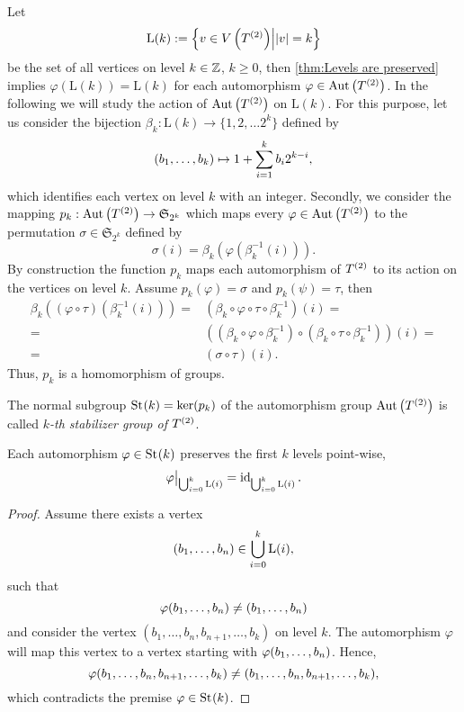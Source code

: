 Let
\begin{equation*}
\mathrm{L}(k):=\left\lbrace v\in\VT\middle\vert \lvert v\rvert=k\right\rbrace
\end{equation*}
be the set of all vertices on level $k\in\Z$, $k\geq 0$,  then \cref{thm:Levels are preserved} implies $\varphi(\mathrm{L}(k))=\mathrm{L}(k)$ for each automorphism $\varphi\in\AutT$. In the following we will study the action of $\AutT$ on $\mathrm{L}(k)$. For this purpose, let us consider the bijection $\beta_k\colon\mathrm{L}(k)\to\lbrace 1,2,\ldots 2^k\rbrace$ defined by 
\begin{equation*}
(\seq[k]{b})\mapsto 1+\sum_{i=1}^{k} b_i2^{k-i},
\end{equation*}
which identifies each vertex on level $k$ with an integer. Secondly, we consider the mapping $p_k:\AutT\to\mathfrak{S}_{2^k}$ which maps every $\varphi\in\AutT$ to the permutation $\sigma\in\mathfrak{S}_{2^k}$ defined by
\begin{equation*}
\sigma(i)=\beta_k(\varphi(\beta_k^{-1}(i))).
\end{equation*}
By construction the function $p_k$ maps each automorphism of $\T$ to its action on the vertices on level $k$. Assume $p_k(\varphi)=\sigma$ and $p_k(\psi)=\tau$, then
\begin{align*}
\beta_k((\varphi\circ\tau)(\beta_k^{-1}(i)))=&(\beta_k\circ\varphi\circ\tau\circ \beta_k^{-1})(i)=\\
=&((\beta_k\circ\varphi\circ \beta_k^{-1})\circ(\beta_k\circ\tau\circ \beta_k^{-1}))(i)=\\
=&(\sigma\circ\tau)(i).
\end{align*}
Thus, $p_k$ is a homomorphism of groups.

\begin{defin}\label{def:Stabilizer Group}
The normal subgroup $\St{k}=\ker(p_k)$ of the automorphism group $\AutT$ is called \textit{$k$-th stabilizer group of $\T$}.
\end{defin}

\begin{pro}
Each automorphism $\varphi\in\St{k}$ preserves the first $k$ levels point-wise, \ie
\begin{equation*}
\varphi\big\vert_{\bigcup_{i=0}^k\mathrm{L}(i)}=\id_{\bigcup_{i=0}^k\mathrm{L}(i)}.
\end{equation*}
\end{pro}
\begin{proof}
Assume there exists a vertex 
\begin{equation*}
(\seq{b})\in\bigcup_{i=0}^k\mathrm{L}(i),
\end{equation*}
such that 
\begin{equation*}
\varphi(\seq{b})\neq (\seq{b})
\end{equation*}
and consider the vertex $(b_1,\ldots,b_n,b_{n+1},\ldots,b_k)$ on level $k$. The automorphism $\varphi$ will map this vertex to a vertex starting with $\varphi(\seq{b})$. Hence, 
\begin{equation*}
\varphi(\seq{b},b_{n+1},\ldots,b_k)\neq(b_1,\ldots,b_n,b_{n+1},\ldots,b_k),
\end{equation*}
which contradicts the premise $\varphi\in\St{k}$. 
\end{proof}